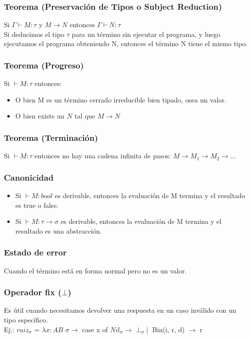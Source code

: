 \documentclass[10pt,a4paper]{article}
\begin{document}
\subsubsection*{Teorema (Preservación de Tipos o Subject Reduction)}
Si $\Gamma \vdash M : \tau$ y $M \rightarrow N$ entonces $\Gamma \vdash N:\tau$ \\
Si deducimos el tipo $\tau$ para un término sin ejecutar el programa, y luego ejecutamos el programa obteniendo N, entonces el término N tiene el mismo tipo. 
\subsubsection*{Teorema (Progreso)}
Si $\vdash M:\tau$ entonces: 
\begin{itemize}
    \item O bien M es un término cerrado irreducible bien tipado, osea un valor. 
    \item O bien existe un $N$ tal que $M \rightarrow N$
\end{itemize}
\subsubsection*{Teorema (Terminación)}
Si $\vdash M:\tau$ entonces no hay una cadena infinita de pasos: $M \rightarrow M_{1} \rightarrow M_{2} \rightarrow ...$
\subsubsection*{Canonicidad}
\begin{itemize}
    \item Si $\vdash M:bool$ es derivable, entonces la evaluación de M termina y el resultado es true o false.
    \item Si $\vdash M:\tau \rightarrow \sigma$ es derivable, entonces la evaluación de M termina y el resultado es una abstracción. 
\end{itemize}
\subsubsection*{Estado de error}
Cuando el término está en forma normal pero no es un valor.
\subsubsection*{Operador fix ($\bot$)}
Es útil cuando necesitamos devolver una respuesta en un caso inválido con un tipo específico. \\
Ej.: $raiz_{\sigma}$ = $\lambda x:AB$ $\sigma \rightarrow$ case x of $Nil_{\sigma} \rightarrow$  $\bot_{\sigma} \mid$  Bin(i, r, d) $\rightarrow$ r
\end{document}
